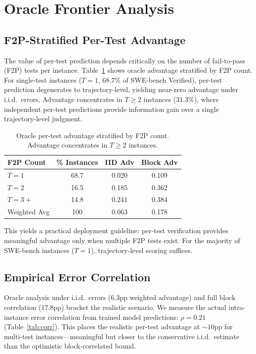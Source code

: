 \documentclass[11pt,a4paper]{article}
\begin{document}
\section{Oracle Frontier Analysis}
\label{sec:oracle}

\subsection{F2P-Stratified Per-Test Advantage}

The value of per-test prediction depends critically on the number of fail-to-pass (F2P) tests per instance. Table~\ref{tab:f2p} shows oracle advantage stratified by F2P count. For single-test instances ($T{=}1$, $68.7\%$ of SWE-bench Verified), per-test prediction degenerates to trajectory-level, yielding near-zero advantage under i.i.d.\ errors. Advantage concentrates in $T{\geq}2$ instances ($31.3\%$), where independent per-test predictions provide information gain over a single trajectory-level judgment.

\begin{table}[t]
\centering
\small
\caption{Oracle per-test advantage stratified by F2P count. Advantage concentrates in $T{\geq}2$ instances.}
\label{tab:f2p}
\begin{tabular}{lccc}
\toprule
\textbf{F2P Count} & \textbf{\% Instances} & \textbf{IID Adv} & \textbf{Block Adv} \\
\midrule
$T{=}1$ & 68.7 & 0.020 & 0.109 \\
$T{=}2$ & 16.5 & 0.185 & 0.362 \\
$T{=}3+$ & 14.8 & 0.241 & 0.384 \\
\midrule
Weighted Avg & 100 & 0.063 & 0.178 \\
\bottomrule
\end{tabular}
\end{table}

This yields a practical deployment guideline: per-test verification provides meaningful advantage only when multiple F2P tests exist. For the majority of SWE-bench instances ($T{=}1$), trajectory-level scoring suffices.

\subsection{Empirical Error Correlation}

Oracle analysis under i.i.d.\ errors ($6.3$pp weighted advantage) and full block correlation ($17.8$pp) bracket the realistic scenario. We measure the actual intra-instance error correlation from trained model predictions: $\rho{=}0.21$ (Table~\ref{tab:corr}). This places the realistic per-test advantage at ${\sim}10$pp for multi-test instances---meaningful but closer to the conservative i.i.d.\ estimate than the optimistic block-correlated bound.
\end{document}
